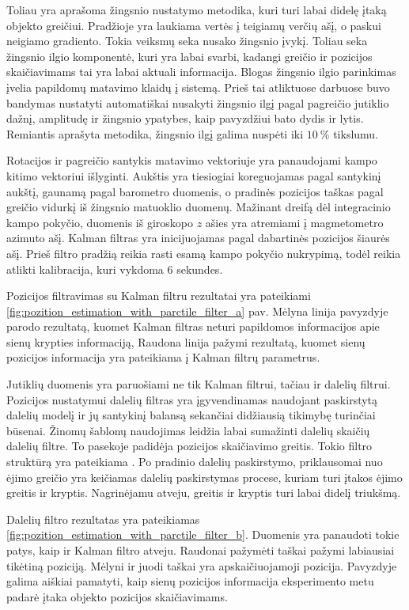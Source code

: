 Toliau yra aprašoma žingsnio nustatymo metodika, kuri turi labai didelę įtaką objekto greičiui. Pradžioje yra laukiama vertės į teigiamų verčių ašį, o paskui neigiamo gradiento. Tokia veiksmų seka nusako žingsnio įvykį. Toliau seka žingsnio ilgio komponentė, kuri yra labai svarbi, kadangi greičio ir pozicijos skaičiavimams tai yra labai aktuali informacija. Blogas žingsnio ilgio parinkimas įvelia papildomų matavimo klaidų į sistemą. Prieš tai atliktuose darbuose \cite{kim2004step, goyal2011strap} buvo bandymas nustatyti automatiškai nusakyti žingsnio ilgį pagal pagreičio jutiklio dažnį, amplitudę ir žingsnio ypatybes, kaip pavyzdžiui bato dydis ir lytis. Remiantis aprašyta metodika, žingsnio ilgį galima nuspėti iki $10~\%$ tikslumu.

Rotacijos ir pagreičio santykis matavimo vektoriuje yra panaudojami kampo kitimo vektoriui išlyginti. Aukštis yra tiesiogiai koreguojamas pagal santykinį aukštį, gaunamą pagal barometro duomenis, o pradinės pozicijos taškas pagal greičio vidurkį iš žingsnio matuoklio duomenų. Mažinant dreifą dėl integracinio kampo pokyčio, duomenis iš giroskopo $z$ ašies yra atremiami į magmetometro azimuto ašį. Kalman filtras yra inicijuojamas pagal dabartinės pozicijos šiaurės ašį. Prieš filtro pradžią reikia rasti esamą kampo pokyčio nukrypimą, todėl reikia atlikti kalibracija, kuri vykdoma 6 sekundes.

Pozicijos filtravimas su Kalman filtru rezultatai yra pateikiami \ref{fig:pozition_estimation_with_parctile_filter_a} pav. Mėlyna linija pavyzdyje parodo rezultatą, kuomet Kalman filtras neturi papildomos informacijos apie sienų krypties informaciją, Raudona linija pažymi rezultatą, kuomet sienų pozicijos informacija yra pateikiama į Kalman filtrų parametrus.

Jutiklių duomenis yra paruošiami ne tik Kalman filtrui, tačiau ir dalelių filtrui. Pozicijos nustatymui dalelių filtras yra įgyvendinamas naudojant paskirstytą dalelių modelį ir jų santykinį balansą sekančiai didžiausią tikimybę turinčiai būsenai. Žinomų šablonų naudojimas leidžia labai sumažinti dalelių skaičių dalelių filtre. To pasekoje padidėja pozicijos skaičiavimo greitis. Tokio filtro struktūrą yra pateikiama \cite{willemsen2013kalibrierung}. Po pradinio dalelių paskirstymo, priklausomai nuo ėjimo greičio yra keičiamas dalelių paskirstymas procese, kuriam turi įtakos ėjimo greitis ir kryptis. Nagrinėjamu atveju, greitis ir kryptis turi labai didelį triukšmą.

Dalelių filtro rezultatas yra pateikiamas \ref{fig:pozition_estimation_with_parctile_filter_b}. Duomenis yra panaudoti tokie patys, kaip ir Kalman filtro atveju. Raudonai pažymėti taškai pažymi labiausiai tikėtiną poziciją. Mėlyni ir juodi taškai yra apskaičiuojamoji pozicija. Pavyzdyje galima aiškiai pamatyti, kaip sienų pozicijos informacija eksperimento metu padarė įtaka objekto pozicijos skaičiavimams.

